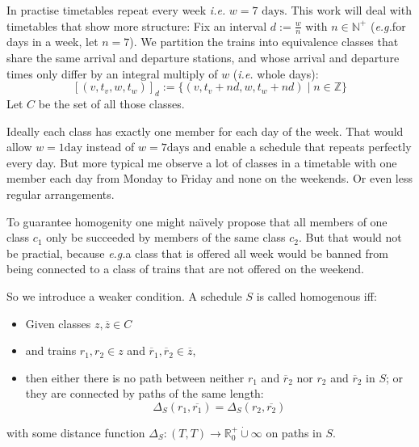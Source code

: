 \documentclass{amsart} %
\def\ie{\emph{i.e.}}
\def\eg{\emph{e.g.}}
\def\naively{na\"{\i}vely}	%
\newcommand{\ol}[1]{\overline{#1}}
\begin{document}

In practise timetables repeat every week \ie{} \(w = 7 \textrm{ days}\).
This work will deal with timetables that show more structure: Fix an
interval \(d := \frac{w}{n}\) with \(n \in \mathbb{N}^+\) (\eg for
days in a week, let \(n=7\)).  We partition the trains into
equivalence classes that share the same arrival and departure
stations, and whose arrival and departure times only differ by an
integral multiply of \(w\) (\ie{} whole days):
\begin{equation}
  \left[\left( v, t_v, w, t_w \right) \right]_d := \{(v, t_v+n d, w, t_w +n d) \mid n \in \mathbb{Z}\}
\end{equation}
Let \(C\) be the set of all those classes.

Ideally each class has exactly one member for each day of the week.
That would allow \(w = 1 \textrm{day}\) instead of \(w = 7 \textrm{days}\)
and enable a schedule that repeats perfectly every day.  But more
typical me observe a lot of classes in a timetable with one member
each day from Monday to Friday and none on the weekends.  Or even less
regular arrangements.

To guarantee homogenity one might \naively{} propose that all members
of one class \(c_1\) only be succeeded by members of the same class
\(c_2\).  But that would not be practial, because \eg a class that is
offered all week would be banned from being connected to a class of trains that
are not offered on the weekend.



So we introduce a weaker condition.  A schedule \(S\) is called
homogenous iff:
\begin{itemize}
\item Given classes \(z, \ol{z} \in C\)
\item and trains \(r_1, r_2 \in z\) and \(\ol{r}_1,\ol{r}_2 \in \ol{z}\),
\item then either there is no path between neither \(r_1\) and
  \(\ol{r}_2\) nor \(r_2\) and \(\ol{r}_2\) in \(S\); or they are connected by paths of the same length:
\begin{equation}
\label{homoEq}
  \Delta_S (r_1, \ol{r_1}) = \Delta_S (r_2, \ol{r_2})
\end{equation}
\end{itemize}
with some distance function \(\Delta_S \colon \left(T,T\right) \to
\mathbb{R}^+_0 \mathbin{\dot{\cup}} \infty \) on paths in \(S\).
\end{document}
